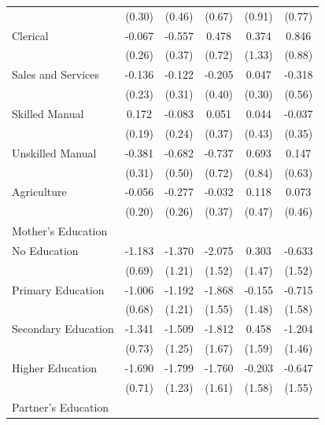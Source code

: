 \begin{longtable}{l*{5}{c}}
                    & (0.30) & (0.46) & (0.67) & (0.91) & (0.77) \\
\hspace{1em}Clerical & -0.067 & -0.557 & 0.478 & 0.374 & 0.846 \\
                    & (0.26) & (0.37) & (0.72) & (1.33) & (0.88) \\
\hspace{1em}Sales and Services & -0.136 & -0.122 & -0.205 & 0.047 & -0.318 \\
                    & (0.23) & (0.31) & (0.40) & (0.30) & (0.56) \\
\hspace{1em}Skilled Manual & 0.172 & -0.083 & 0.051 & 0.044 & -0.037 \\
                    & (0.19) & (0.24) & (0.37) & (0.43) & (0.35) \\
\hspace{1em}Unskilled Manual & -0.381 & -0.682 & -0.737 & 0.693 & 0.147 \\
                    & (0.31) & (0.50) & (0.72) & (0.84) & (0.63) \\
\hspace{1em}Agriculture & -0.056 & -0.277 & -0.032 & 0.118 & 0.073 \\
                    & (0.20) & (0.26) & (0.37) & (0.47) & (0.46) \\
\multicolumn{6}{l}{Mother's Education} \\
\hspace{1em}No Education & -1.183\sym{*} & -1.370 & -2.075 & 0.303 & -0.633 \\
                    & (0.69) & (1.21) & (1.52) & (1.47) & (1.52) \\
\hspace{1em}Primary Education & -1.006 & -1.192 & -1.868 & -0.155 & -0.715 \\
                    & (0.68) & (1.21) & (1.55) & (1.48) & (1.58) \\
\hspace{1em}Secondary Education & -1.341\sym{*} & -1.509 & -1.812 & 0.458 & -1.204 \\
                    & (0.73) & (1.25) & (1.67) & (1.59) & (1.46) \\
\hspace{1em}Higher Education & -1.690\sym{**} & -1.799 & -1.760 & -0.203 & -0.647 \\
                    & (0.71) & (1.23) & (1.61) & (1.58) & (1.55) \\
\multicolumn{6}{l}{Partner's Education} \\

\end{longtable}

